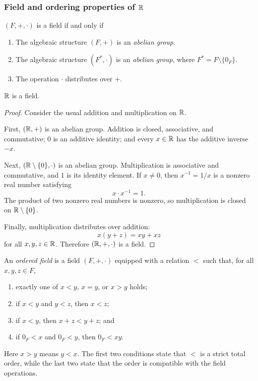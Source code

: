 \documentclass[12pt, a4paper]{article}
\begin{document}
\subsubsection{Field and ordering properties of \texorpdfstring{\(\mathbb{R}\)}{R}}

\begin{definition}
  \((F, +, \cdot)\) is a field if and only if
  \begin{enumerate}
    \item The algebraic structure \((F, +)\) is an \emph{abelian group}.
    \item The algebraic structure \((F^{*}, \cdot)\) is an
      \emph{abelian group}, where \(F^{*} = F \setminus \{0_F\}\).
    \item The operation \(\cdot\) distributes over \(+\).
  \end{enumerate}
\end{definition}

\begin{theorem}
  \(\mathbb{R}\) is a field.
\end{theorem}

\begin{proof}
  Consider the usual addition and multiplication on \(\mathbb{R}\).

  First, \((\mathbb{R},+)\) is an abelian group. Addition is closed, associative,
  and commutative; \(0\) is an additive identity; and every \(x\in\mathbb{R}\) has
  the additive inverse \(-x\).

  Next, \((\mathbb{R}\setminus\{0\},\cdot)\) is an abelian group. Multiplication is
  associative and commutative, and \(1\) is its identity element. If
  \(x\neq 0\), then \(x^{-1}=1/x\) is a nonzero real number satisfying
  \[
    x\cdot x^{-1}=1.
  \]
  The product of two nonzero real numbers is nonzero, so multiplication is
  closed on \(\mathbb{R}\setminus\{0\}\).

  Finally, multiplication distributes over addition:
  \[
    x(y+z)=xy+xz
  \]
  for all \(x,y,z\in\mathbb{R}\). Therefore \((\mathbb{R},+,\cdot)\) is a field.
\end{proof}

\begin{definition}
  An \emph{ordered field} is a field \((F,+,\cdot)\) equipped with a relation
  \(<\) such that, for all \(x,y,z\in F\),
  \begin{enumerate}
    \item exactly one of \(x<y\), \(x=y\), or \(x>y\) holds;
    \item if \(x<y\) and \(y<z\), then \(x<z\);
    \item if \(x<y\), then \(x+z<y+z\); and
    \item if \(0_F<x\) and \(0_F<y\), then \(0_F<xy\).
  \end{enumerate}
  Here \(x>y\) means \(y<x\). The first two conditions state that \(<\) is a
  strict total order, while the last two state that the order is compatible
  with the field operations.
\end{definition}
\end{document}
